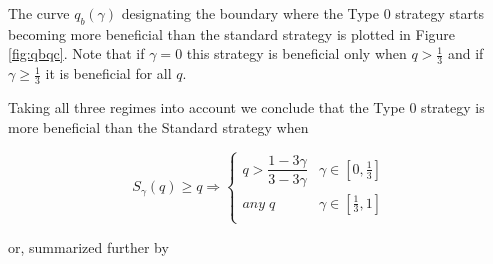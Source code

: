 \documentclass[letterpaper,12pt]{report}
\theoremstyle{plain}
\theoremstyle{definition}
\begin{document}
The curve $q_b(\gamma)$ designating the boundary where the Type 0 strategy starts becoming more beneficial than the standard strategy is plotted in Figure \ref{fig:qbqc}.
Note that if $\gamma=0$ this strategy is beneficial only when $q>\frac{1}{3}$ and if $\gamma\geq\frac{1}{3}$ it is beneficial for all $q$.

\noindent%
\begin{minipage}{\linewidth}
\label{fig:qbqc}
\end{minipage}
\linebreak


Taking all three regimes into account we conclude that the Type 0 strategy is more beneficial than the Standard strategy when

\begin{equation}\label{eq:0overhonest}
S_{\gamma}(q)\geq q \Longrightarrow
\begin{cases}
q>\dfrac{1-3\gamma}{3-3\gamma} & \gamma\in [0,\frac{1}{3}] \\ 
\mathit{any\;} q & \gamma\in [\frac{1}{3},1] \\ 
\end{cases}
\end{equation}

or, summarized further by 
\end{document}
